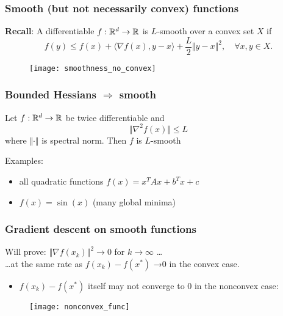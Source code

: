 \documentclass[aspectratio=149]{beamer}
\begin{document}
\begin{frame}
  \frametitle{Smooth (but not necessarily convex) functions}
  \textbf{Recall}: A differentiable $f : \mathbb{R}^d \to \mathbb{R}$ is $L$-smooth over a convex set $X$ if
  \begin{equation}
    f(y) \le f(x) + \langle \nabla f(x), y- x \rangle + \frac{L}{2} \Vert y-x \Vert^2, \quad \forall x,y \in X.
  \end{equation}
  \begin{figure}[ht]
    \centering
    \texttt{[image: smoothness\_no\_convex]}
  \end{figure}
\end{frame}


\begin{frame}
  \frametitle{Bounded Hessians $\Rightarrow$ smooth}
  \begin{lemma}%
    Let $f: \mathbb{R}^d \to \mathbb{R}$ be twice differentiable and
    \begin{equation}
      \Vert \nabla^2 f(x) \Vert \le L
    \end{equation}
    where $\Vert \cdot \Vert$ is spectral norm. Then $f$ is $L$-smooth
  \end{lemma}

  Examples:
  \begin{itemize}
    \item all quadratic functions $f(x)= x^T Ax + b^T x + c$
    \item $f(x) = \sin (x)$ (many global minima)
  \end{itemize}
\end{frame}


\begin{frame}
  \frametitle{Gradient descent on smooth functions}
  Will prove: $\Vert \nabla f(x_k) \Vert^2 \to 0$ for $k\to \infty$ \ldots \\
  \ldots at the same rate as $f(x_k) -f(x^*)$ →0 in the convex case.
  \begin{itemize}
    \item $f(x_k) -f(x^*)$ itself may not converge to 0 in the nonconvex case:
  \end{itemize}
  \begin{figure}[ht]
    \centering
    \texttt{[image: nonconvex\_func]}
    \caption{\label{fig:label} }
  \end{figure}
\end{frame}
\end{document}
